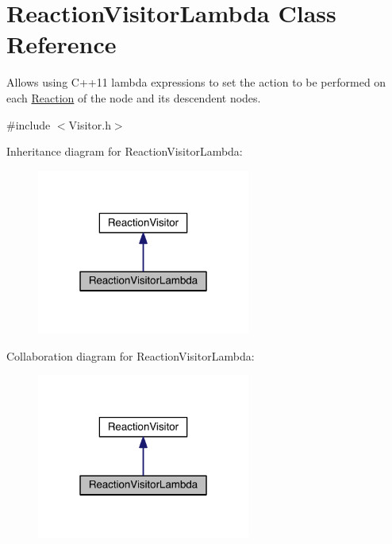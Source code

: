 \hypertarget{classReactionVisitorLambda}{\section{Reaction\+Visitor\+Lambda Class Reference}
\label{classReactionVisitorLambda}
}


Allows using C++11 lambda expressions to set the action to be performed on each \hyperlink{classReaction}{Reaction} of the node and its descendent nodes.  




{\ttfamily \#include $<$Visitor.\+h$>$}



Inheritance diagram for Reaction\+Visitor\+Lambda\+:
\nopagebreak
\begin{figure}[H]
\begin{center}
\leavevmode
\includegraphics[width=199pt]{classReactionVisitorLambda__inherit__graph}
\end{center}
\end{figure}


Collaboration diagram for Reaction\+Visitor\+Lambda\+:
\nopagebreak
\begin{figure}[H]
\begin{center}
\leavevmode
\includegraphics[width=199pt]{classReactionVisitorLambda__coll__graph}
\end{center}
\end{figure}
